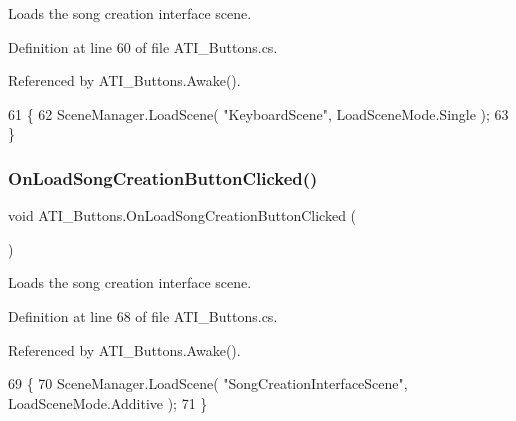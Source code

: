 Loads the song creation interface scene. 



Definition at line 60 of file A\+T\+I\+\_\+\+Buttons.\+cs.



Referenced by A\+T\+I\+\_\+\+Buttons.\+Awake().


\begin{DoxyCode}
61     \{
62         SceneManager.LoadScene( \textcolor{stringliteral}{"KeyboardScene"}, LoadSceneMode.Single );
63     \}
\end{DoxyCode}
\mbox{\label{group___a_t_i_buttons_unity_ga6f6e66c53a80c3bcd9b7e7238a3b82fd}} 
\subsubsection{\texorpdfstring{On\+Load\+Song\+Creation\+Button\+Clicked()}{OnLoadSongCreationButtonClicked()}}
{\footnotesize\ttfamily void A\+T\+I\+\_\+\+Buttons.\+On\+Load\+Song\+Creation\+Button\+Clicked (\begin{DoxyParamCaption}{ }\end{DoxyParamCaption})\hspace{0.3cm}{\ttfamily [private]}}



Loads the song creation interface scene. 



Definition at line 68 of file A\+T\+I\+\_\+\+Buttons.\+cs.



Referenced by A\+T\+I\+\_\+\+Buttons.\+Awake().


\begin{DoxyCode}
69     \{
70         SceneManager.LoadScene( \textcolor{stringliteral}{"SongCreationInterfaceScene"}, LoadSceneMode.Additive );
71     \}
\end{DoxyCode}
